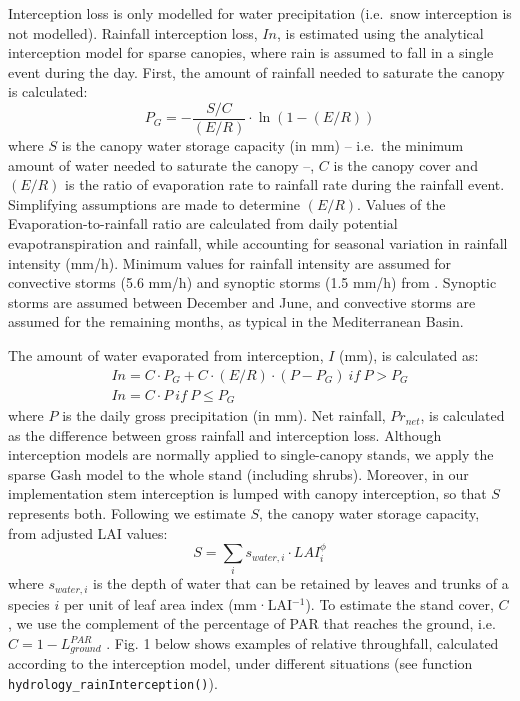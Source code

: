 \documentclass[]{book}
\begin{document}
Interception loss is only modelled for water precipitation (i.e.~snow interception is not modelled). Rainfall interception loss, \(In\), is estimated using the \citet{Gash1995} analytical interception model for sparse canopies, where rain is assumed to fall in a single event during the day. First, the amount of rainfall needed to saturate the canopy is calculated:
\begin{equation}
P_G = - \frac{S/C}{(E/R)} \cdot \ln(1-(E/R))
\end{equation}
where \(S\) is the canopy water storage capacity (in mm) -- i.e.~the minimum amount
of water needed to saturate the canopy --, \(C\) is the canopy cover and \((E/R)\) is
the ratio of evaporation rate to rainfall rate during the rainfall event.
Simplifying assumptions are made to determine \((E/R)\). Values of the Evaporation-to-rainfall ratio are calculated from daily potential evapotranspiration and rainfall, while accounting for seasonal variation in rainfall intensity (mm/h). Minimum values for rainfall intensity are assumed for convective storms (5.6 mm/h) and synoptic storms (1.5 mm/h) from \citet{Miralles2010}. Synoptic storms are assumed between December and June, and convective storms are assumed for the remaining months, as typical in the Mediterranean Basin.

The amount of water evaporated from interception, \(I\) (mm), is calculated as:
\begin{eqnarray}
In = C\cdot P_G+C\cdot(E/R)\cdot(P-P_G) \: {if}\: P > P_G \\
In = C\cdot P\: {if}\: P \leq P_G
\end{eqnarray}
where \(P\) is the daily gross precipitation (in mm). Net rainfall, \(Pr_{net}\), is
calculated as the difference between gross rainfall and interception loss.
Although interception models are normally applied to single-canopy stands, we
apply the sparse Gash model to the whole stand (including shrubs). Moreover, in
our implementation stem interception is lumped with canopy interception, so that
\(S\) represents both. Following \citet{Watanabe1996} we estimate \(S\), the
canopy water storage capacity, from adjusted LAI values:
\begin{equation}
S=\sum_{i}{s_{water,i}\cdot LAI_{i}^{\phi}}
\end{equation}
where \(s_{water,i}\) is the depth of water that can be retained by leaves and
trunks of a species \(i\) per unit of leaf area index (mm·LAI\(^{-1}\)). To estimate
the stand cover, \(C\), we use the complement of the percentage of PAR that reaches
the ground, i.e. \(C = 1 - L^{PAR}_{ground}\) \citep{Deguchi2006}. Fig. 1 below
shows examples of relative throughfall, calculated according to the interception
model, under different situations (see function \texttt{hydrology\_rainInterception()}).
\end{document}
